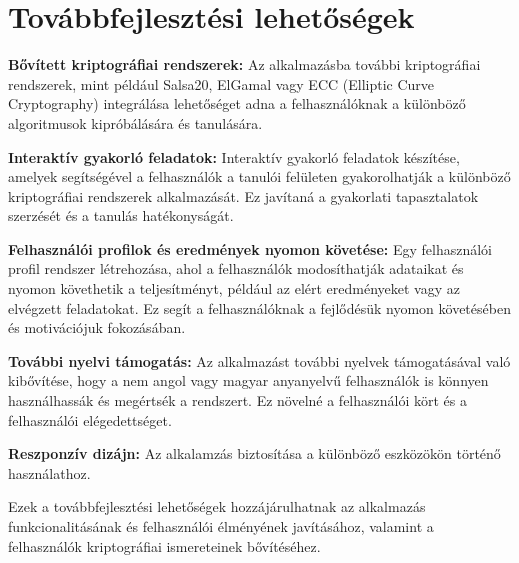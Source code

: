 \chapter{Továbbfejlesztési lehetőségek}


\textbf{Bővített kriptográfiai rendszerek:} Az alkalmazásba további kriptográfiai rendszerek, mint például Salsa20, ElGamal vagy ECC (Elliptic Curve Cryptography) integrálása lehetőséget adna a felhasználóknak a különböző algoritmusok kipróbálására és tanulására.

\textbf{Interaktív gyakorló feladatok:} Interaktív gyakorló feladatok készítése, amelyek segítségével a felhasználók a tanulói felületen gyakorolhatják a különböző kriptográfiai rendszerek alkalmazását. Ez javítaná a gyakorlati tapasztalatok szerzését és a tanulás hatékonyságát.

\textbf{Felhasználói profilok és eredmények nyomon követése:} Egy felhasználói profil rendszer létrehozása, ahol a felhasználók modosíthatják adataikat és nyomon követhetik a teljesítményt, például az elért eredményeket vagy az elvégzett feladatokat. Ez segít a felhasználóknak a fejlődésük nyomon követésében és motivációjuk fokozásában.

\textbf{További nyelvi támogatás:} Az alkalmazást további nyelvek támogatásával való kibővítése, hogy a nem angol vagy magyar anyanyelvű felhasználók is könnyen használhassák és megértsék a rendszert. Ez növelné a felhasználói kört és a felhasználói elégedettséget.

\textbf{Reszponzív dizájn:} Az alkalamzás biztosítása a különböző eszközökön történő használathoz.

\vspace{10pt}
Ezek a továbbfejlesztési lehetőségek hozzájárulhatnak az alkalmazás funkcionalitásának és felhasználói élményének javításához, valamint a felhasználók kriptográfiai ismereteinek bővítéséhez.